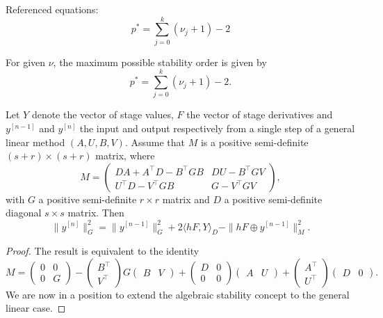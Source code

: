 Referenced equations:
\begin{equation}
    p^* = \sum_{j=0}^k (\nu_j + 1) - 2
    \tag{521a}
\end{equation}

\begin{theorem}

  \label{thm:521B}
For given $\nu$, the maximum possible stability order is given by
\[
p^* = \sum_{j=0}^{k} (\nu_j + 1) - 2. \tag{521a}
\]
\end{theorem}

\begin{theorem}

  \label{thm:523A}
Let $Y$ denote the vector of stage values, $F$ the vector of stage derivatives and $y^{[n-1]}$ and $y^{[n]}$ the input and output respectively from a single step of a general linear method $(A, U, B, V)$. Assume that $M$ is a positive semi-definite $(s + r) \times (s + r)$ matrix, where
\[
M = \begin{pmatrix}
DA + A^\top D - B^\top G B & D U - B^\top G V \\
U^\top D - V^\top G B & G - V^\top G V
\end{pmatrix},
\tag{523b}
\]
with $G$ a positive semi-definite $r \times r$ matrix and $D$ a positive semi-definite diagonal $s \times s$ matrix. Then
\[
\| y^{[n]} \|_G^2 = \| y^{[n-1]} \|_G^2 + 2 \langle hF, Y \rangle_D - \| hF \oplus y^{[n-1]} \|_M^2.
\]
\end{theorem}

\begin{proof}
The result is equivalent to the identity
\[
M = \begin{pmatrix} 0 & 0 \\ 0 & G \end{pmatrix} - \begin{pmatrix} B^\top \\ V^\top \end{pmatrix} G \begin{pmatrix} B & V \end{pmatrix} + \begin{pmatrix} D & 0 \\ 0 & 0 \end{pmatrix} \begin{pmatrix} A & U \end{pmatrix} + \begin{pmatrix} A^\top \\ U^\top \end{pmatrix} \begin{pmatrix} D & 0 \end{pmatrix}.
\]
We are now in a position to extend the algebraic stability concept to the general linear case.
\end{proof}

